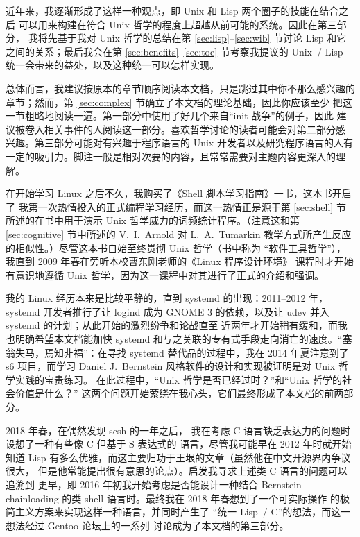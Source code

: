 \documentclass[UTF8]{ctexart}
\begin{document}
近年来，我逐渐形成了这样一种观点，即 Unix 和 Lisp 两个圈子的技能在结合之后
可以用来构建在符合 Unix 哲学的程度上超越从前可能的系统。因此在第三部分，
我将先基于我对 Unix 哲学的总结在第 \ref{sec:lisp}--\ref{sec:wib} 节讨论
Lisp 和它之间的关系；最后我会在第 \ref{sec:benefits}--\ref{sec:toe}
节考察我提议的 Unix~/ Lisp 统一会带来的益处，以及这种统一可以怎样实现。

总体而言，我建议按原本的章节顺序阅读本文档，只是跳过其中你不那么感兴趣的
章节；然而，第 \ref{sec:complex} 节确立了本文档的理论基础，因此你应该至少
把这一节粗略地阅读一遍。第一部分中使用了好几个来自“init 战争”的例子，因此
建议被卷入相关事件的人阅读这一部分。喜欢哲学讨论的读者可能会对第二部分感
兴趣。第三部分可能对有兴趣于程序语言的 Unix 开发者以及研究程序语言的人有
一定的吸引力。脚注一般是相对次要的内容，且常常需要对主题内容更深入的理解。





\newpart
\printbibliography[heading = bibintoc, title = 参考资料]
\newpage
{}\label{sec:afterword}

在开始学习 Linux 之后不久，我购买了《Shell 脚本学习指南》一书，这本书开启了
我第一次热情投入的正式编程学习经历，而这一热情正是源于第 \ref{sec:shell}
节所述的在书中用于演示 Unix 哲学威力的词频统计程序。（注意这和第
\ref{sec:cognitive} 节中所述的 V.~I.\ Arnold 对 L.~A.\ Tumarkin
教学方式所产生反应的相似性。）尽管这本书自始至终贯彻 Unix 哲学（书中称为
“软件工具哲学”），我直到 2009 年春在旁听本校曹东刚老师的《Linux 程序设计环境》
课程时才开始有意识地遵循 Unix 哲学，因为这一课程中对其进行了正式的介绍和强调。

我的 Linux 经历本来是比较平静的，直到 systemd 的出现：2011--2012 年，systemd
开发者推行了让 logind 成为 GNOME 3 的依赖，以及让
udev 并入 systemd 的计划；从此开始的激烈纷争和论战直至
近两年才开始稍有缓和，而我也明确希望本文档能加快
systemd 和与之关联的专有式手段走向消亡的速度。“塞翁失马，焉知非福”：在寻找
systemd 替代品的过程中，我在 2014 年夏注意到了 s6 项目，而学习 Daniel
J.\ Bernstein 风格软件的设计和实现被证明是对 Unix 哲学实践的宝贵练习。
在此过程中，“Unix 哲学是否已经过时？”和“Unix 哲学的社会价值是什么？”
这两个问题开始萦绕在我心头，它们最终形成了本文档的前两部分。

2018 年春，在偶然发现 scsh 的一年之后，
我在考虑 C 语言缺乏表达力的问题时设想了一种有些像 C 但基于 S 表达式的
语言，尽管我可能早在 2012 年时就开始知道 Lisp
有多么优雅，而这主要归功于王垠的文章（虽然他在中文开源界内争议很大，
但是他常能提出很有意思的论点）。启发我寻求上述类 C 语言的问题可以追溯到
更早，即 2016 年初我开始考虑是否能设计一种结合 Bernstein chainloading 的类
shell 语言时。最终我在 2018 年春想到了一个可实际操作
的极简主义方案来实现这样一种语言，并同时产生了
“统一 Lisp~/ C”的想法，而这一想法经过 Gentoo 论坛上的一系列
讨论成为了本文档的第三部分。
\end{document}
